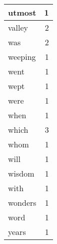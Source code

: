 \begin{center}
\begin{longtable}{l|r}
utmost & 1 \\ \hline
valley & 2 \\ \hline
was & 2 \\ \hline
weeping & 1 \\ \hline
went & 1 \\ \hline
wept & 1 \\ \hline
were & 1 \\ \hline
when & 1 \\ \hline
which & 3 \\ \hline
whom & 1 \\ \hline
will & 1 \\ \hline
wisdom & 1 \\ \hline
with & 1 \\ \hline
wonders & 1 \\ \hline
word & 1 \\ \hline
years & 1 \\ \hline
\end{longtable}
\end{center}



\normalsize



